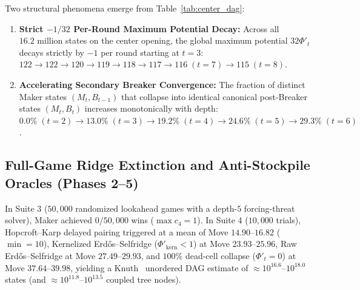 \documentclass[11pt,a4paper]{article}
\theoremstyle{definition}
\theoremstyle{remark}
\begin{document}
Two structural phenomena emerge from Table~\ref{tab:center_dag}:
\begin{enumerate}[noitemsep]
    \item \textbf{Strict $-1/32$ Per-Round Maximum Potential Decay:} Across all $16.2\text{ million}$ states on the center opening, the global maximum potential $32\Phi'_t$ decays strictly by $-1$ per round starting at $t=3$: $122 \to 122 \to 120 \to 119 \to 118 \to 117 \to 116\;(t=7) \to 115\;(t=8)$.
    \item \textbf{Accelerating Secondary Breaker Convergence:} The fraction of distinct Maker states $(M_t, B_{t-1})$ that collapse into identical canonical post-Breaker states $(M_t, B_t)$ increases monotonically with depth: $0.0\% \;(t=2) \to 13.0\% \;(t=3) \to 19.2\% \;(t=4) \to 24.6\% \;(t=5) \to 29.3\% \;(t=6)$.
\end{enumerate}

\subsection{Full-Game Ridge Extinction and Anti-Stockpile Oracles (Phases 2--5)}
In Suite 3 ($50,000$ randomized lookahead games with a depth-$5$ forcing-threat solver), Maker achieved $0 / 50,000$ wins ($\max c_4 = 1$). In Suite 4 ($10,000$ trials), Hopcroft--Karp delayed pairing triggered at a mean of Move $14.90$--$16.82$ ($\min = 10$), Kernelized Erd\H{o}s--Selfridge ($\Phi'_{\mathrm{kern}} < 1$) at Move $23.93$--$25.96$, Raw Erd\H{o}s--Selfridge at Move $27.49$--$29.93$, and $100\%$ dead-cell collapse ($\Phi'_t = 0$) at Move $37.64$--$39.98$, yielding a Knuth~\cite{Knuth1975} unordered DAG estimate of $\approx 10^{16.6}$--$10^{18.0}$ states (and $\approx 10^{11.8}$--$10^{13.5}$ coupled tree nodes).
\end{document}
